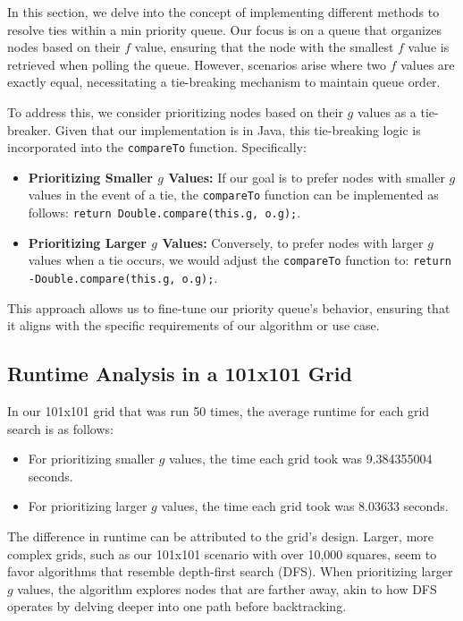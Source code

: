 \documentclass{article}
\begin{document}
In this section, we delve into the concept of implementing different methods to resolve ties within a min priority queue. Our focus is on a queue that organizes nodes based on their $f$ value, ensuring that the node with the smallest $f$ value is retrieved when polling the queue. However, scenarios arise where two $f$ values are exactly equal, necessitating a tie-breaking mechanism to maintain queue order.

To address this, we consider prioritizing nodes based on their $g$ values as a tie-breaker. Given that our implementation is in Java, this tie-breaking logic is incorporated into the \texttt{compareTo} function. Specifically:

\begin{itemize}
    \item \textbf{Prioritizing Smaller $g$ Values:} If our goal is to prefer nodes with smaller $g$ values in the event of a tie, the \texttt{compareTo} function can be implemented as follows: \texttt{return Double.compare(this.g, o.g);}.
    \item \textbf{Prioritizing Larger $g$ Values:} Conversely, to prefer nodes with larger $g$ values when a tie occurs, we would adjust the \texttt{compareTo} function to: \texttt{return -Double.compare(this.g, o.g);}.
\end{itemize}

This approach allows us to fine-tune our priority queue's behavior, ensuring that it aligns with the specific requirements of our algorithm or use case.

\subsection{Runtime Analysis in a 101x101 Grid}
In our 101x101 grid that was run 50 times, the average runtime for each grid search is as follows:
\begin{itemize}
    \item For prioritizing smaller $g$ values, the time each grid took was 9.384355004 seconds.
    \item For prioritizing larger $g$ values, the time each grid took was 8.03633 seconds.
\end{itemize}

The difference in runtime can be attributed to the grid's design. Larger, more complex grids, such as our 101x101 scenario with over 10,000 squares, seem to favor algorithms that resemble depth-first search (DFS). When prioritizing larger $g$ values, the algorithm explores nodes that are farther away, akin to how DFS operates by delving deeper into one path before backtracking.
\end{document}
